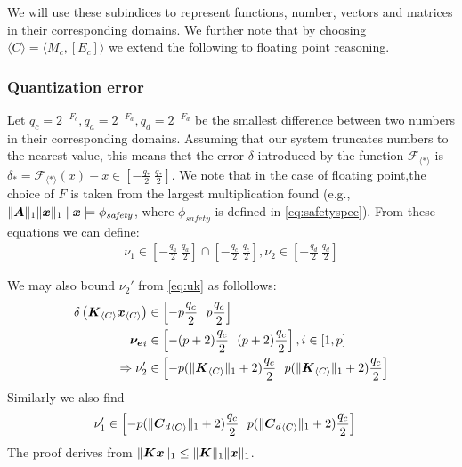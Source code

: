 \documentclass[sigconf]{llncs}
\DeclarePairedDelimiter\norm{\lVert}{\rVert}
\newcommand{\mat}[1]{\boldsymbol{#1}}
\renewcommand{\vec}[1]{\boldsymbol{#1}}
\begin{document}
We will use these subindices to represent functions, number, vectors and matrices in their
corresponding domains. We further note that by choosing $\langle C \rangle = \langle M_c,[E_c] \rangle$
we extend the following to floating point reasoning.

\subsubsection{Quantization error}
\label{appendix:quantization}

Let $q_c=2^{-F_c},q_a=2^{-F_a},q_d=2^{-F_d}$ be the smallest difference
between two numbers in their corresponding domains.  Assuming that our
system truncates numbers to the nearest value, this means thet the error
$\delta$ introduced by the function $\mathcal{F}_{\langle * \rangle}$ is
$\delta_*=\mathcal{F}_{\langle * \rangle}(x)-x \in \left[-\frac{q_*}{2}\
\frac{q_*}{2}\right]$.  We note that in the case of floating point,the
choice of $F$ is taken from the largest multiplication found (e.g.,
$\norm{\mat{A}}_1\norm{\vec{x}}_1 \mid \vec{x} \models \phi_\mathit{safety}$,
where $\phi_\mathit{safety}$ is defined in \ref{eq:safetyspec}). From these
equations we can define:
%
\begin{align*}
\nu_1 \in \left[-\frac{q_a}{2}\ \frac{q_a}{2}\right] \cap  \left[-\frac{q_c}{2}\ \frac{q_c}{2}\right],
\nu_2 \in \left[-\frac{q_d}{2}\ \frac{q_d}{2}\right]
\end{align*}

We may also bound $\nu_2'$ from \eqref{eq:uk} as follollows:
\begin{align*}
\delta\left(\mat{K}_{\langle C\rangle} \vec{x}_{\langle C\rangle} \right) &\in \left[ -p \frac{q_c}{2}\ \ p \frac{q_c}{2}\right]\\
{\vec{\nu_e}}_i &\in \left[ -(p+2) \frac{q_c}{2}\ \ (p+2) \frac{q_c}{2}\right], i \in [1, p]\\
\Rightarrow \nu_2' &\in \left[  -p(\norm{\mat{K}_{\langle C \rangle}}_1+2) \frac{q_c}{2}\ \ p(\norm{\mat{K}_{\langle C \rangle}}_1+2) \frac{q_c}{2}\right]
\end{align*}
Similarly we also find
\begin{align*}
\nu_1' &\in \left[  -p(\norm{{\mat{C}_d}_{\langle C \rangle}}_1+2) \frac{q_c}{2}\ \ p(\norm{{\mat{C}_d}_{\langle C \rangle}}_1+2) \frac{q_c}{2}\right]
\end{align*}
The proof derives from $\norm{\mat{K}\vec{x}}_1 \leq \norm{\mat{K}}_1\norm{\vec{x}}_1$.
\end{document}

